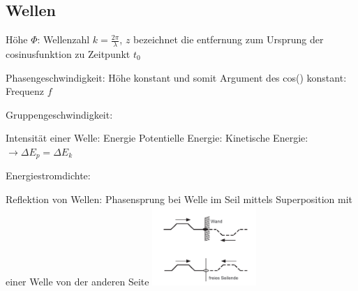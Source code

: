 \subsection{Wellen}
    Höhe $\Phi$:
    Wellenzahl $k = \frac{2 \pi}{\lambda}$, $z$ bezeichnet die entfernung zum Ursprung der cosinusfunktion zu Zeitpunkt $t_0$

    Phasengeschwindigkeit: Höhe konstant und somit Argument des cos() konstant:
    Frequenz $f$

    Gruppengeschwindigkeit:


    Intensität einer Welle: Energie
    Potentielle Energie:
    Kinetische Energie:
    $\rightarrow \Delta E_p = \Delta E_k$  

    Energiestromdichte:

    Reflektion von Wellen:
    Phasensprung bei Welle im Seil mittels Superposition mit einer Welle von der anderen Seite
    \centering
    \includegraphics[height = 30mm]{src/images/welle_superposition.png}
